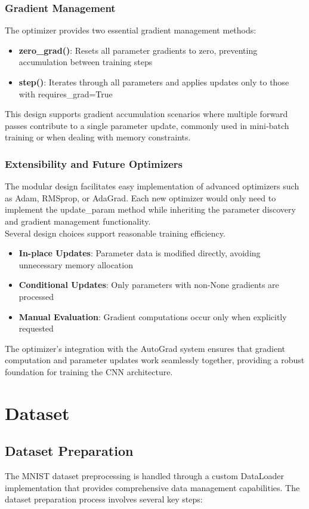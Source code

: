 \documentclass[conference]{IEEEtran}
\begin{document}
\subsubsection{Gradient Management}
The optimizer provides two essential gradient management methods:
\begin{itemize}
\item \textbf{zero\_grad()}: Resets all parameter gradients to zero, preventing accumulation between training steps
\item \textbf{step()}: Iterates through all parameters and applies updates only to those with requires\_grad=True
\end{itemize}
This design supports gradient accumulation scenarios where multiple forward passes contribute to a single parameter update, commonly used in mini-batch training or when dealing with memory constraints.

\subsubsection{Extensibility and Future Optimizers}
The modular design facilitates easy implementation of advanced optimizers such as Adam, RMSprop, or AdaGrad. Each new optimizer would only need to implement the update\_param method while inheriting the parameter discovery and gradient management functionality.\\

\noindent Several design choices support reasonable training efficiency. \begin{itemize}
\item \textbf{In-place Updates}: Parameter data is modified directly, avoiding unnecessary memory allocation
\item \textbf{Conditional Updates}: Only parameters with non-None gradients are processed
\item \textbf{Manual Evaluation}: Gradient computations occur only when explicitly requested
\end{itemize}
The optimizer's integration with the AutoGrad system ensures that gradient computation and parameter updates work seamlessly together, providing a robust foundation for training the CNN architecture.

\section{Dataset}
\subsection{Dataset Preparation}
The MNIST dataset preprocessing is handled through a custom DataLoader implementation that provides comprehensive data management capabilities. The dataset preparation process involves several key steps:
\end{document}
